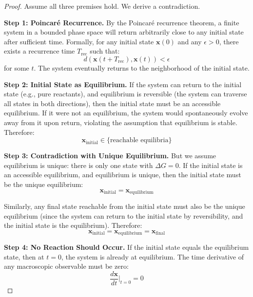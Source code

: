 \documentclass[12pt,a4paper]{article}
\theoremstyle{definition}
\theoremstyle{remark}
\begin{document}
\begin{proof}
Assume all three premises hold. We derive a contradiction.

\textbf{Step 1: Poincaré Recurrence.}
By the Poincaré recurrence theorem, a finite system in a bounded phase space will return arbitrarily close to any initial state after sufficient time. Formally, for any initial state $\mathbf{x}(0)$ and any $\epsilon > 0$, there exists a recurrence time $T_{\text{rec}}$ such that:
\begin{equation}
d(\mathbf{x}(t + T_{\text{rec}}), \mathbf{x}(t)) < \epsilon
\end{equation}
for some $t$. The system eventually returns to the neighborhood of the initial state.

\textbf{Step 2: Initial State as Equilibrium.}
If the system can return to the initial state (e.g., pure reactants), and equilibrium is reversible (the system can traverse all states in both directions), then the initial state must be an accessible equilibrium. If it were not an equilibrium, the system would spontaneously evolve away from it upon return, violating the assumption that equilibrium is stable. Therefore:
\begin{equation}
\mathbf{x}_{\text{initial}} \in \{\text{reachable equilibria}\}
\end{equation}

\textbf{Step 3: Contradiction with Unique Equilibrium.}
But we assume equilibrium is unique: there is only one state with $\Delta G = 0$. If the initial state is an accessible equilibrium, and equilibrium is unique, then the initial state must be the unique equilibrium:
\begin{equation}
\mathbf{x}_{\text{initial}} = \mathbf{x}_{\text{equilibrium}}
\end{equation}

Similarly, any final state reachable from the initial state must also be the unique equilibrium (since the system can return to the initial state by reversibility, and the initial state is the equilibrium). Therefore:
\begin{equation}
\mathbf{x}_{\text{initial}} = \mathbf{x}_{\text{equilibrium}} = \mathbf{x}_{\text{final}}
\end{equation}

\textbf{Step 4: No Reaction Should Occur.}
If the initial state equals the equilibrium state, then at $t = 0$, the system is already at equilibrium. The time derivative of any macroscopic observable must be zero:
\begin{equation}
\frac{d\mathbf{x}}{dt}\bigg|_{t=0} = 0
\end{equation}


\end{proof}
\end{document}
